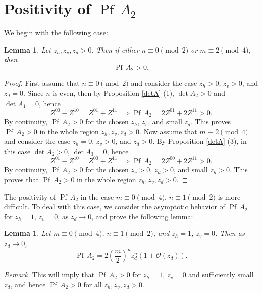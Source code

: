 \documentclass[12pt,reqno]{amsart}
\numberwithin{equation}{section}
\newcommand{\Pf}{{\operatorname{Pf}\,}}
\newtheorem{lem}[theo]{{\sc \bf Lemma}}
\begin{document}
\section{Positivity of $\Pf A_2$} \label{A2}

We begin with the following case:

\begin{lem}
Let $z_h,z_v,z_d>0$. Then if either $n\equiv 0\pmod 2$ or $m\equiv 2\pmod 4$, then 
\begin{equation}\label{A2pos1}
\Pf A_2>0.
\end{equation}
\end{lem}
\begin{proof}
First assume that $n\equiv 0\pmod 2$ and consider the case $z_h>0$, $z_v>0$, and $z_d=0$. 
Since $n$ is even, then by Proposition \ref{detA} (1),
$\det A_2>0$ and $\det A_1=0$, hence 
\begin{equation} Z^{00}-Z^{10}=Z^{01}+Z^{11}\implies \Pf A_2=2Z^{01}+2Z^{11}>0. 
\end{equation} 
By continuity, $\Pf A_2>0$ for the chosen $z_h$, $z_v$, and small $z_d$. This proves $\Pf A_2>0$ in the whole region $z_h,z_v,z_d>0$. 
Now assume that $m\equiv 2\pmod 4$ and consider the case $z_h=0$, $z_v>0$, and $z_d>0$. By Proposition \ref{detA} (3),
in this case $\det A_2>0$, $\det A_3=0$, hence
\begin{equation}\label{a15}
Z^{01}-Z^{10}=Z^{00}+Z^{11} \implies  \Pf A_2= 2Z^{00}+2Z^{11}>0.
\end{equation}
By continuity, $\Pf A_2>0$ for the chosen $z_v>0$, $z_d>0$, and small $z_h>0$.
This proves that $\Pf A_2>0$ in the whole region
$z_h,z_v,z_d>0$.
\end{proof}

The positivity of $\Pf A_2$ in the 
case $m\equiv 0\pmod 4$, $n\equiv 1\pmod 2$ is more difficult. 
To deal with this case,  we consider the asymptotic behavior of 
$\Pf A_2$ for $z_h=1$, $z_v=0$, as $z_d\to 0$, and prove the following lemma:

\begin{lem} \label{lem1} Let $m\equiv 0\pmod 4$, $n\equiv 1\pmod 2$,  and  $z_h=1$, $z_v=0$. Then as $z_d\to 0$,
\begin{equation}\label{pos1}
\Pf A_2=2\left(\frac{m}{2}\right)^n  z_d^n(1+\mathcal O(z_d)).
\end{equation} 
\end{lem}

{\it Remark.} This will imply that $\Pf A_2>0$ for $z_h=1$, $z_v=0$ and sufficiently small $z_d$, and hence $\Pf A_2>0$ for all
$z_h,z_v,z_d>0$.  
\end{document}
